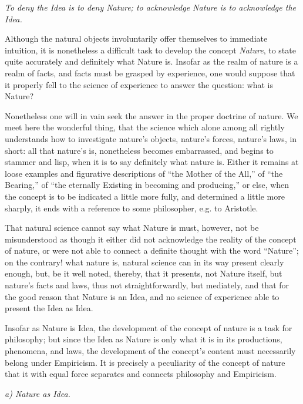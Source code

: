 \documentclass[12pt]{book}
\begin{document}
\emph{To deny the Idea is to deny Nature; to acknowledge Nature is to acknowledge the Idea.}

Although the natural objects involuntarily offer themselves to immediate intuition, it is nonetheless a
difficult task to develop the concept \emph{Nature}, to state quite accurately and definitely what Nature
is. Insofar as the realm of nature is a realm of facts, and facts must be grasped by
experience, one would suppose that it properly fell to the science of experience to answer the question:
what is Nature?

Nonetheless one will in vain seek the answer in the proper doctrine of nature. We meet here the wonderful
thing, that the science which alone among all rightly understands how to investigate nature's objects,
nature's forces, nature's laws, in short: all that nature's is, nonetheless becomes embarrassed, and
begins to stammer and lisp, when it is to say definitely what nature is. Either it remains at loose
examples and figurative descriptions of ``the Mother of the All,'' of ``the Bearing,'' of ``the eternally
Existing in becoming and producing,'' or else, when the concept is to be indicated a little more fully,
and determined a little more sharply, it ends with a reference to some philosopher, e.g. to Aristotle.

That natural science cannot say what Nature is must, however, not be misunderstood as though it either did
not acknowledge the reality of the concept of nature, or were not able to connect a definite thought with
the word ``Nature''; on the contrary! what nature is, natural science can in its way present clearly
enough, but, be it well noted, thereby, that it presents, not Nature itself, but nature's facts and laws,
thus not straightforwardly, but mediately, and that for the good reason that Nature is an Idea, and no
science of experience able to present the Idea as Idea.

Insofar as Nature is Idea, the development of the concept of nature is a task for philosophy; but since
the Idea as Nature is only what it is in its productions, phenomena, and laws, the development of the
concept's content must necessarily belong under Empiricism. It is precisely a peculiarity of the concept
of nature that it with equal force separates and connects philosophy and Empiricism.
\begin{center}\emph{a) Nature as Idea.}\end{center}
\end{document}
